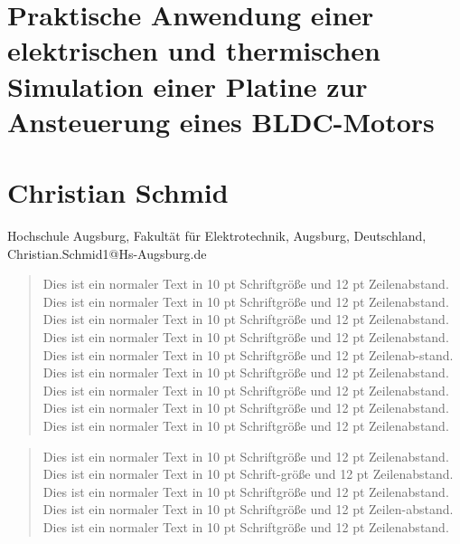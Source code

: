 \documentclass[10pt,a4paper,oneside,abstracton]{scrartcl}
\begin{document}
	
	\section*{Praktische Anwendung einer elektrischen und thermischen Simulation einer Platine zur Ansteuerung eines BLDC-Motors}
	\section*{Christian Schmid}
	Hochschule Augsburg, Fakultät für Elektrotechnik, Augsburg, Deutschland, Christian.Schmid1@Hs-Augsburg.de 
	
	
	\begin{abstract} %
		\noindent %
		Dies ist ein normaler Text in 10 pt Schriftgröße und 12 pt Zeilenabstand. Dies ist ein normaler Text in 10 pt Schriftgröße und 12 pt Zeilenabstand. Dies ist ein normaler Text in 10 pt Schriftgröße und 12 pt Zeilenabstand. Dies ist ein normaler Text in 10 pt Schriftgröße und 12 pt Zeilenabstand. Dies ist ein normaler Text in 10 pt Schriftgröße und 12 pt Zeilenab-stand. Dies ist ein normaler Text in 10 pt Schriftgröße und 12 pt Zeilenabstand. Dies ist ein normaler Text in 10 pt Schriftgröße und 12 pt Zeilenabstand. Dies ist ein normaler Text in 10 pt Schriftgröße und 12 pt Zeilenabstand. Dies ist ein normaler Text in 10 pt Schriftgröße und 12 pt Zeilenabstand.
	\end{abstract}
	
	\renewcommand{\abstractname}{Abstract} %
	
	\begin{abstract}
		\noindent %
		Dies ist ein normaler Text in 10 pt Schriftgröße und 12 pt Zeilenabstand. Dies ist ein normaler Text in 10 pt Schrift-größe und 12 pt Zeilenabstand. Dies ist ein normaler Text in 10 pt Schriftgröße und 12 pt Zeilenabstand. Dies ist ein normaler Text in 10 pt Schriftgröße und 12 pt Zeilen-abstand. Dies ist ein normaler Text in 10 pt Schriftgröße und 12 pt Zeilenabstand.
	\end{abstract}
	
\end{document}
